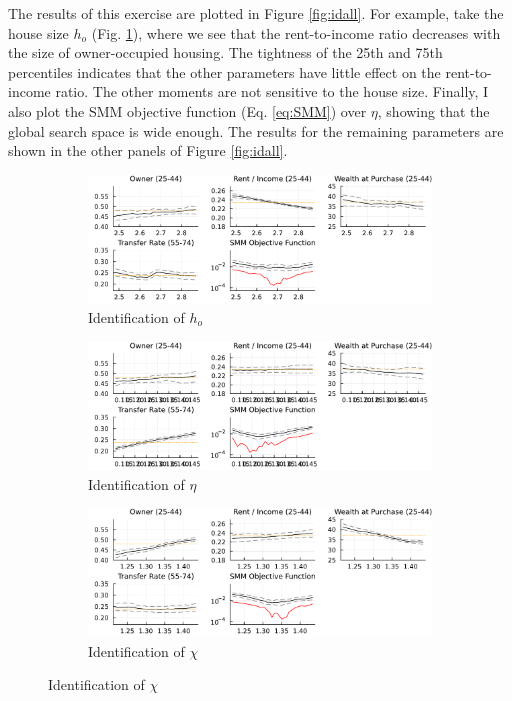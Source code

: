 \documentclass[12pt]{article}
\begin{document}
The results of this exercise are plotted in Figure \ref{fig:idall}. For example, take the house size $h_o$ (Fig. \ref{fig:hoid}), where we see that the rent-to-income ratio decreases with the size of owner-occupied housing. The tightness of the 25th and 75th percentiles indicates that the other parameters have little effect on the rent-to-income ratio. The other moments are not sensitive to the house size. Finally, I also plot the SMM objective function (Eq. \ref{eq:SMM}) over $\eta$, showing that the global search space is wide enough. The results for the remaining parameters are shown in the other panels of Figure \ref{fig:idall}.

\begin{figure}\caption{Identification of $\eta,h_o,\chi$.}\label{fig:idall}
	\begin{subfigure}{\textwidth}\caption{Identification of $h_o$}\label{fig:hoid}
		\includegraphics[width=\textwidth]{../tabfig/est/identification/ho.pdf}
	\end{subfigure}
	\begin{subfigure}{\textwidth}\caption{Identification of $\eta$}\label{fig:etaid}
		\includegraphics[width=\textwidth]{../tabfig/est/identification/eta.pdf}
	\end{subfigure}
	\begin{subfigure}{\textwidth}\caption{Identification of $\chi$}\label{fig:chiid}
		\includegraphics[width=\textwidth]{../tabfig/est/identification/chi.pdf}

\end{subfigure}
\end{figure}
\end{document}
